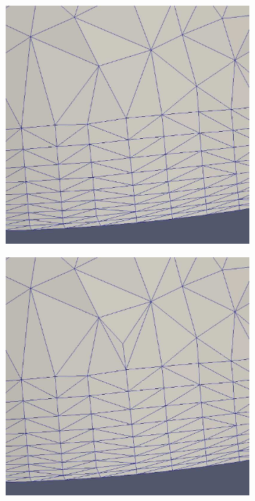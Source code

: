 \documentclass[conf]{new-aiaa}
\begin{document}
\begin{figure}[hbt!]
\centering
\begin{subfigure}{.5\textwidth}
  \centering
  \includegraphics[width=.8\linewidth]{point-insertion-swapping/initial.eps}
  \caption{}
  \label{point-insert1}
\end{subfigure}%
\begin{subfigure}{.5\textwidth}
  \centering
  \includegraphics[width=.8\linewidth]{point-insertion-swapping/point-inserted.eps}
  \caption{}
  \label{point-insert2}
\end{subfigure}
\begin{subfigure}{.5\textwidth}
  \centering

\end{subfigure}
\end{figure}
\end{document}
